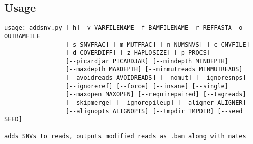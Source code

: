 \documentclass[letterpaper,11pt]{article}
\begin{document}
\subsection{Usage}
\begin{verbatim}
usage: addsnv.py [-h] -v VARFILENAME -f BAMFILENAME -r REFFASTA -o OUTBAMFILE
                 [-s SNVFRAC] [-m MUTFRAC] [-n NUMSNVS] [-c CNVFILE]
                 [-d COVERDIFF] [-z HAPLOSIZE] [-p PROCS]
                 [--picardjar PICARDJAR] [--mindepth MINDEPTH]
                 [--maxdepth MAXDEPTH] [--minmutreads MINMUTREADS]
                 [--avoidreads AVOIDREADS] [--nomut] [--ignoresnps]
                 [--ignoreref] [--force] [--insane] [--single]
                 [--maxopen MAXOPEN] [--requirepaired] [--tagreads]
                 [--skipmerge] [--ignorepileup] [--aligner ALIGNER]
                 [--alignopts ALIGNOPTS] [--tmpdir TMPDIR] [--seed SEED]

adds SNVs to reads, outputs modified reads as .bam along with mates


\end{verbatim}
\end{document}
